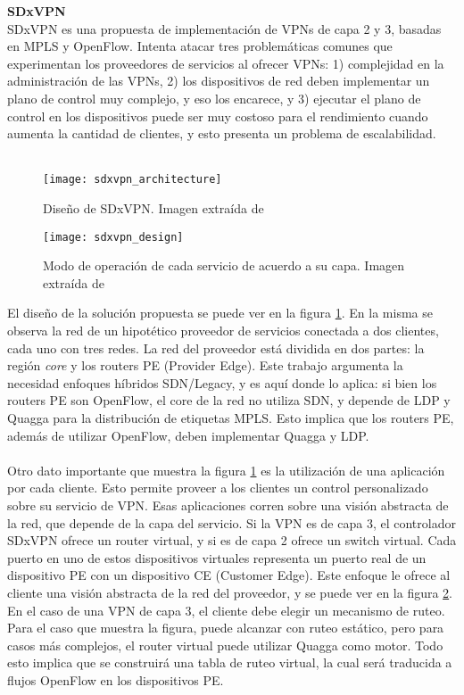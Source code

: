 \textbf{SDxVPN} \\
SDxVPN \cite{sdxvpn} es una propuesta de implementación de VPNs de capa 2 y 3, basadas en MPLS y OpenFlow. Intenta atacar tres problemáticas comunes que experimentan los proveedores de servicios al ofrecer VPNs: 1) complejidad en la administración de las VPNs, 2) los dispositivos de red deben implementar un plano de control muy complejo, y eso los encarece, y 3) ejecutar el plano de control en los dispositivos puede ser muy costoso para el rendimiento cuando aumenta la cantidad de clientes, y esto presenta un problema de escalabilidad. \\ \\
\begin{figure}[t]
	\caption{Diseño de SDxVPN. Imagen extraída de \cite{sdxvpn}}
	\texttt{[image: sdxvpn\_architecture]}
	\centering
	\label{fig:sdxvpn_architecture}
\end{figure}
\begin{figure}[t]
	\caption{Modo de operación de cada servicio de acuerdo a su capa. Imagen extraída de \cite{sdxvpn}}
	\texttt{[image: sdxvpn\_design]}
	\centering
	\label{fig:sdxvpn_design}
\end{figure}
El diseño de la solución propuesta se puede ver en la figura \ref{fig:sdxvpn_architecture}. En la misma se observa la red de un hipotético proveedor de servicios conectada a dos clientes, cada uno con tres redes. La red del proveedor está dividida en dos partes: la región \textit{core} y los routers PE (Provider Edge). Este trabajo argumenta la necesidad enfoques híbridos SDN/Legacy, y es aquí donde lo aplica: si bien los routers PE son OpenFlow, el core de la red no utiliza SDN, y depende de LDP y Quagga para la distribución de etiquetas MPLS. Esto implica que los routers PE, además de utilizar OpenFlow, deben implementar Quagga y LDP. \\ \\
Otro dato importante que muestra la figura \ref{fig:sdxvpn_architecture} es la utilización de una aplicación por cada cliente. Esto permite proveer a los clientes un control personalizado sobre su servicio de VPN. Esas aplicaciones corren sobre una visión abstracta de la red, que depende de la capa del servicio. Si la VPN es de capa 3, el controlador SDxVPN ofrece un router virtual, y si es de capa 2 ofrece un switch virtual. Cada puerto en uno de estos dispositivos virtuales representa un puerto real de un dispositivo PE con un dispositivo CE (Customer Edge). Este enfoque le ofrece al cliente una visión abstracta de la red del proveedor, y se puede ver en la figura \ref{fig:sdxvpn_design}. En el caso de una VPN de capa 3, el cliente debe elegir un mecanismo de ruteo. Para el caso que muestra la figura, puede alcanzar con ruteo estático, pero para casos más complejos, el router virtual puede utilizar Quagga como motor. Todo esto implica que se construirá una tabla de ruteo virtual, la cual será traducida a flujos OpenFlow en los dispositivos PE. \\
